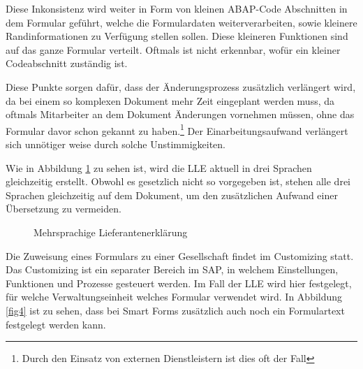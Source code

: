 	Diese Inkonsistenz wird weiter in Form von kleinen \ac{ABAP}-Code Abschnitten in dem Formular geführt, welche die Formulardaten weiterverarbeiten, sowie kleinere Randinformationen zu Verfügung stellen sollen. Diese kleineren Funktionen sind auf das ganze Formular verteilt. Oftmals ist nicht erkennbar, wofür ein kleiner Codeabschnitt zuständig ist.
	
	Diese Punkte sorgen dafür, dass der Änderungsprozess zusätzlich verlängert wird, da bei einem so komplexen Dokument mehr Zeit eingeplant werden muss, da oftmals Mitarbeiter an dem Dokument Änderungen vornehmen müssen, ohne das Formular davor schon gekannt zu haben.\footnote{Durch den Einsatz von externen Dienstleistern ist dies oft der Fall} Der Einarbeitungsaufwand verlängert sich unnötiger weise durch solche Unstimmigkeiten.
	
	Wie in Abbildung \ref{fig3} zu sehen ist, wird die \ac{LLE} aktuell in drei Sprachen gleichzeitig erstellt. Obwohl es gesetzlich nicht so vorgegeben ist, stehen alle drei Sprachen gleichzeitig auf dem Dokument, um den zusätzlichen Aufwand einer Übersetzung zu vermeiden.
	
	\begin{figure}[ht]
		\centering
		\caption{Mehrsprachige Lieferantenerklärung}
		\label{fig3}
	\end{figure}
	


	Die Zuweisung eines Formulars zu einer Gesellschaft findet im Customizing statt. Das Customizing ist ein separater Bereich im SAP, in welchem Einstellungen, Funktionen und Prozesse gesteuert werden. Im Fall der \ac{LLE} wird hier festgelegt, für welche Verwaltungseinheit welches Formular verwendet wird. In Abbildung \ref{fig4} ist zu sehen, dass bei Smart Forms zusätzlich auch noch ein Formulartext festgelegt werden kann.
	
